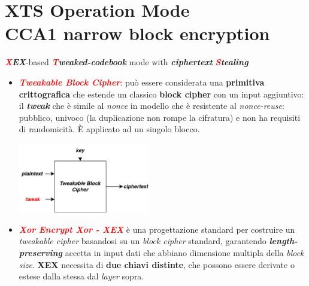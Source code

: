\section{XTS Operation Mode \\ \small{CCA1 narrow block encryption}}

\begin{flushleft}
    \textcolor{red}{\textbf{\textit{X}}}\textbf{\textit{EX}}-based \textcolor{red}{\textbf{\textit{T}}}\textbf{\textit{weaked-codebook}} mode with \textbf{\textit{ciphertext }}\textcolor{red}{\textbf{\textit{S}}}\textbf{\textit{tealing}}
    \begin{itemize}[nosep]
        \item \textcolor{red}{\textbf{\textit{Tweakable Block Cipher}}}: può essere considerata una \textbf{primitiva crittografica} che estende un classico \textbf{block cipher} con un input aggiuntivo: il \textbf{\textit{tweak}} che è simile al \textit{nonce} in modello che è resistente al \textit{nonce-reuse}: pubblico, univoco (la duplicazione non rompe la cifratura) e non ha requisiti di randomicità. È applicato ad un singolo blocco.

        {\centering
            \includegraphics[width=0.45\textwidth]{img/tweak_bd.png}
        \par}

        \item \textcolor{red}{\textbf{\textit{Xor Encrypt Xor - XEX}}} è una progettazione standard per costruire un \textit{tweakable cipher} basandosi su un \textit{block cipher} standard, garantendo \textbf{\textit{length-preserving}} accetta in input dati che abbiano dimensione multipla della \textit{block size}. \textbf{XEX} necessita di \textbf{due chiavi distinte}, che possono essere derivate o estese dalla stessa dal \textit{layer} sopra.


\end{itemize}
\end{flushleft}
